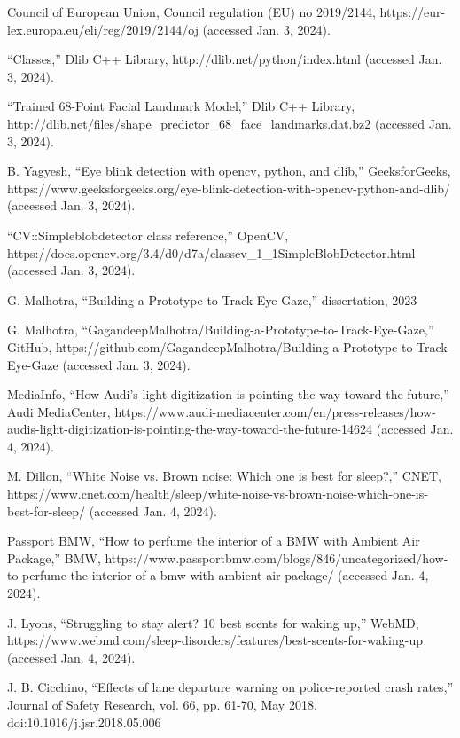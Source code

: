 \documentclass[10pt,conference]{IEEEtran}
\begin{document}
\begin{thebibliography}{00}
     Council of European Union, Council regulation ({EU}) no 2019/2144, https://eur-lex.europa.eu/eli/reg/2019/2144/oj (accessed Jan. 3, 2024).

     “Classes,” Dlib C++ Library, http://dlib.net/python/index.html (accessed Jan. 3, 2024).

     “Trained 68-Point Facial Landmark Model,” Dlib C++ Library, http://dlib.net/files/shape\_predictor\_68\_face\_landmarks.dat.bz2 (accessed Jan. 3, 2024).

     B. Yagyesh, “Eye blink detection with opencv, python, and dlib,” GeeksforGeeks, https://www.geeksforgeeks.org/eye-blink-detection-with-opencv-python-and-dlib/ (accessed Jan. 3, 2024).

     “CV::Simpleblobdetector class reference,” OpenCV, https://docs.opencv.org/3.4/d0/d7a/classcv\_1\_1SimpleBlobDetector.html (accessed Jan. 3, 2024).

     G. Malhotra, “Building a Prototype to Track Eye Gaze,” dissertation, 2023

     G. Malhotra, “GagandeepMalhotra/Building-a-Prototype-to-Track-Eye-Gaze,” GitHub, https://github.com/GagandeepMalhotra/Building-a-Prototype-to-Track-Eye-Gaze (accessed Jan. 3, 2024).

     MediaInfo, “How Audi's light digitization is pointing the way toward the future,” Audi MediaCenter, https://www.audi-mediacenter.com/en/press-releases/how-audis-light-digitization-is-pointing-the-way-toward-the-future-14624 (accessed Jan. 4, 2024).

     M. Dillon, “White Noise vs. Brown noise: Which one is best for sleep?,” CNET, https://www.cnet.com/health/sleep/white-noise-vs-brown-noise-which-one-is-best-for-sleep/ (accessed Jan. 4, 2024).

     Passport BMW, “How to perfume the interior of a BMW with Ambient Air Package,” BMW, https://www.passportbmw.com/blogs/846/uncategorized/how-to-perfume-the-interior-of-a-bmw-with-ambient-air-package/ (accessed Jan. 4, 2024).

     J. Lyons, “Struggling to stay alert? 10 best scents for waking up,” WebMD, https://www.webmd.com/sleep-disorders/features/best-scents-for-waking-up (accessed Jan. 4, 2024).

     J. B. Cicchino, “Effects of lane departure warning on police-reported crash rates,” Journal of Safety Research, vol. 66, pp. 61-70, May 2018. doi:10.1016/j.jsr.2018.05.006


\end{thebibliography}
\end{document}
